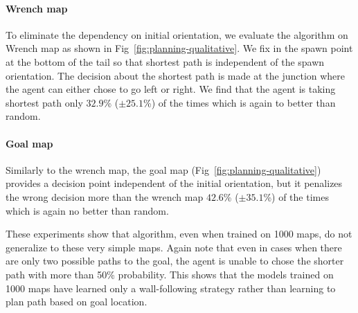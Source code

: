 \paragraph{Wrench map}
To eliminate the dependency on initial orientation, we evaluate the algorithm on Wrench map as shown in Fig~\ref{fig:planning-qualitative}. We fix in the spawn point at the bottom of the tail so that shortest path is independent of the spawn orientation.
The decision about the shortest path is made at the junction where the agent can either chose to go left or right.
We find that the agent is taking shortest path only $32.9$\% ($\pm 25.1$\%) of the times which is again to better than random.

\paragraph{Goal map}
Similarly to the wrench map, the goal map (Fig~\ref{fig:planning-qualitative}) provides a decision point independent of the initial orientation, but it penalizes the wrong decision more than the wrench map $42.6$\% ($\pm 35.1$\%) of the times which is again no better than random.

These experiments show that \NavAiiiCDiDiiL{} algorithm, even when trained on 1000 maps, do not generalize to these very simple maps.
Again note that even in cases when there are only two possible paths to the goal, the agent is unable to chose the shorter path with more than 50\% probability.
This shows that the models trained on 1000 maps have learned only a wall-following strategy rather than learning to plan path based on goal location.



